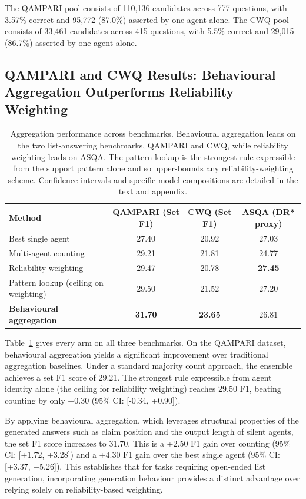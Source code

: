 \documentclass{article}
\begin{document}
The QAMPARI pool consists of 110,136 candidates across 777 questions, with 3.57\% correct and 95,772 (87.0\%) asserted by one agent alone. The CWQ pool consists of 33,461 candidates across 415 questions, with 5.5\% correct and 29,015 (86.7\%) asserted by one agent alone.

\subsection{QAMPARI and CWQ Results: Behavioural Aggregation Outperforms Reliability Weighting}
\label{sec:rq1}

\begin{table}[h]
\centering
\caption{Aggregation performance across benchmarks. Behavioural aggregation leads on the two list-answering benchmarks, QAMPARI and CWQ, while reliability weighting leads on ASQA. The pattern lookup is the strongest rule expressible from the support pattern alone and so upper-bounds any reliability-weighting scheme. Confidence intervals and specific model compositions are detailed in the text and appendix.}
\label{tab:main}
\begin{tabular}{lccc}
\toprule
\textbf{Method} & \textbf{QAMPARI (Set F1)} & \textbf{CWQ (Set F1)} & \textbf{ASQA (DR* proxy)} \\
\midrule
Best single agent & 27.40 & 20.92 & 27.03 \\
Multi-agent counting & 29.21 & 21.81 & 24.77 \\
Reliability weighting & 29.47 & 20.78 & \textbf{27.45} \\
Pattern lookup (ceiling on weighting) & 29.50 & 21.52 & 27.20 \\
\textbf{Behavioural aggregation} & \textbf{31.70} & \textbf{23.65} & 26.81 \\
\bottomrule
\end{tabular}
\end{table}


Table~\ref{tab:main} gives every arm on all three benchmarks. On the QAMPARI dataset, behavioural aggregation yields a significant improvement over traditional aggregation baselines. Under a standard majority count approach, the ensemble achieves a set F1 score of 29.21. The strongest rule expressible from agent identity alone (the ceiling for reliability weighting) reaches 29.50 F1, beating counting by only +0.30 (95\% CI: [-0.34, +0.90]).

By applying behavioural aggregation, which leverages structural properties of the generated answers such as claim position and the output length of silent agents, the set F1 score increases to 31.70. This is a +2.50 F1 gain over counting (95\% CI: [+1.72, +3.28]) and a +4.30 F1 gain over the best single agent (95\% CI: [+3.37, +5.26]). This establishes that for tasks requiring open-ended list generation, incorporating generation behaviour provides a distinct advantage over relying solely on reliability-based weighting.
\end{document}
